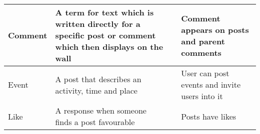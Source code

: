 \begin{center}
\begin{tabular}{| l | l | l | l |}
    Comment          & A term for text which is written directly for a specific post or comment which then displays on the wall &                                     & Comment appears on posts and parent comments  \\ \hline 
    Event            & A post that describes an activity, time and place                                                        &                                     & User can post events and invite users into it \\ \hline
    Like             & A response when someone finds a post favourable                                                          &                                     & Posts have likes                              \\ \hline
    \hline
    \end{tabular}
\end{center}

